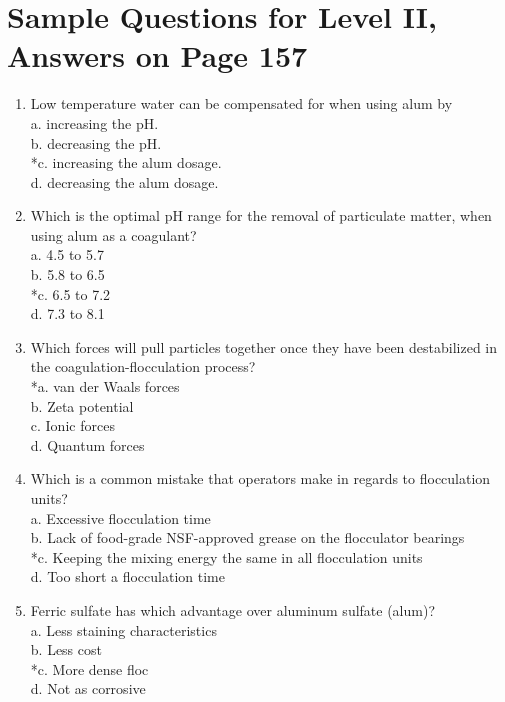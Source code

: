 \section{Sample Questions for Level II, Answers on Page 157}
\begin{enumerate}[label=TII-\arabic*]
\item Low temperature water can be compensated for when using alum by\\
a. increasing the pH.\\
b. decreasing the pH.\\
*c. increasing the alum dosage.\\
d. decreasing the alum dosage.\\
\item Which is the optimal pH range for the removal of particulate matter, when using alum as a coagulant?\\
a. 4.5 to 5.7\\
b. 5.8 to 6.5\\
*c. 6.5 to 7.2\\
d. 7.3 to 8.1\\
\item Which forces will pull particles together once they have been destabilized in the coagulation-flocculation process?\\
*a. van der Waals forces\\
b. Zeta potential\\
c. Ionic forces\\
d. Quantum forces\\
\item Which is a common mistake that operators make in regards to flocculation units?\\
a. Excessive flocculation time\\
b. Lack of food-grade NSF-approved grease on the flocculator bearings\\
*c. Keeping the mixing energy the same in all flocculation units\\
d. Too short a flocculation time\\
\item Ferric sulfate has which advantage over aluminum sulfate (alum)?\\
a. Less staining characteristics\\
b. Less cost\\
*c. More dense floc\\
d. Not as corrosive\\
\end{enumerate}
